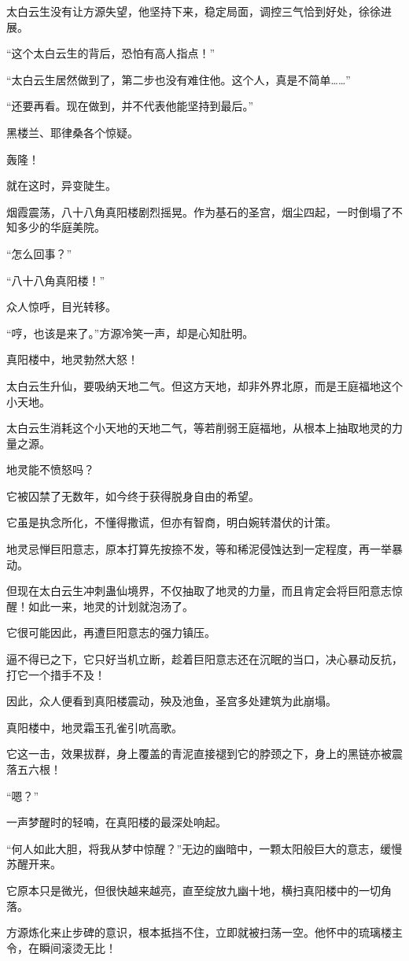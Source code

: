 \begin{this_body}
太白云生没有让方源失望，他坚持下来，稳定局面，调控三气恰到好处，徐徐进展。

“这个太白云生的背后，恐怕有高人指点！”

“太白云生居然做到了，第二步也没有难住他。这个人，真是不简单……”

“还要再看。现在做到，并不代表他能坚持到最后。”

黑楼兰、耶律桑各个惊疑。

轰隆！

就在这时，异变陡生。

烟霞震荡，八十八角真阳楼剧烈摇晃。作为基石的圣宫，烟尘四起，一时倒塌了不知多少的华庭美院。

“怎么回事？”

“八十八角真阳楼！”

众人惊呼，目光转移。

“哼，也该是来了。”方源冷笑一声，却是心知肚明。

真阳楼中，地灵勃然大怒！

太白云生升仙，要吸纳天地二气。但这方天地，却非外界北原，而是王庭福地这个小天地。

太白云生消耗这个小天地的天地二气，等若削弱王庭福地，从根本上抽取地灵的力量之源。

地灵能不愤怒吗？

它被囚禁了无数年，如今终于获得脱身自由的希望。

它虽是执念所化，不懂得撒谎，但亦有智商，明白婉转潜伏的计策。

地灵忌惮巨阳意志，原本打算先按捺不发，等和稀泥侵蚀达到一定程度，再一举暴动。

但现在太白云生冲刺蛊仙境界，不仅抽取了地灵的力量，而且肯定会将巨阳意志惊醒！如此一来，地灵的计划就泡汤了。

它很可能因此，再遭巨阳意志的强力镇压。

逼不得已之下，它只好当机立断，趁着巨阳意志还在沉眠的当口，决心暴动反抗，打它一个措手不及！

因此，众人便看到真阳楼震动，殃及池鱼，圣宫多处建筑为此崩塌。

真阳楼中，地灵霜玉孔雀引吭高歌。

它这一击，效果拔群，身上覆盖的青泥直接褪到它的脖颈之下，身上的黑链亦被震落五六根！

“嗯？”

一声梦醒时的轻喃，在真阳楼的最深处响起。

“何人如此大胆，将我从梦中惊醒？”无边的幽暗中，一颗太阳般巨大的意志，缓慢苏醒开来。

它原本只是微光，但很快越来越亮，直至绽放九幽十地，横扫真阳楼中的一切角落。

方源炼化来止步碑的意识，根本抵挡不住，立即就被扫荡一空。他怀中的琉璃楼主令，在瞬间滚烫无比！

\end{this_body}

